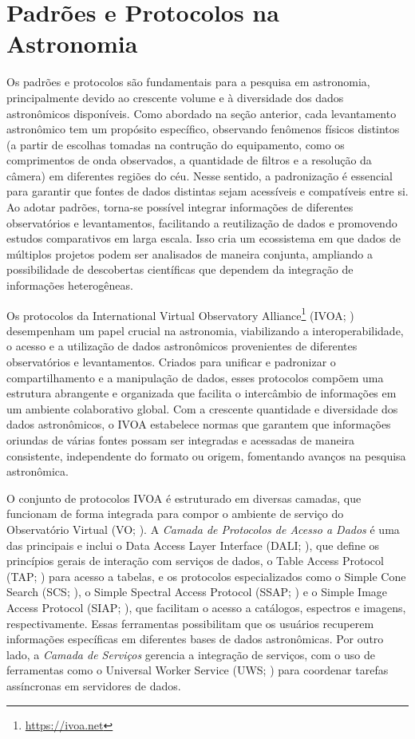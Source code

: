 \section{Padrões e Protocolos na Astronomia}
\label{sec:protocolos}

Os padrões e protocolos são fundamentais para a pesquisa em astronomia, principalmente devido ao crescente volume e à diversidade dos dados astronômicos disponíveis. Como abordado na seção anterior, cada levantamento astronômico tem um propósito específico, observando fenômenos físicos distintos (a partir de escolhas tomadas na contrução do equipamento, como os comprimentos de onda observados, a quantidade de filtros e a resolução da câmera) em diferentes regiões do céu. Nesse sentido, a padronização é essencial para garantir que  fontes de dados distintas sejam acessíveis e compatíveis entre si. Ao adotar padrões, torna-se possível integrar informações de diferentes observatórios e levantamentos, facilitando a reutilização de dados e promovendo estudos comparativos em larga escala. Isso cria um ecossistema em que dados de múltiplos projetos podem ser analisados de maneira conjunta, ampliando a possibilidade de descobertas científicas que dependem da integração de informações heterogêneas.

Os protocolos da International Virtual Observatory Alliance\footnote{\url{https://ivoa.net}} (IVOA; \citealp{ivoa}) desempenham um papel crucial na astronomia, viabilizando a interoperabilidade, o acesso e a utilização de dados astronômicos provenientes de diferentes observatórios e levantamentos. Criados para unificar e padronizar o compartilhamento e a manipulação de dados, esses protocolos compõem uma estrutura abrangente e organizada que facilita o intercâmbio de informações em um ambiente colaborativo global. Com a crescente quantidade e diversidade dos dados astronômicos, o IVOA estabelece normas que garantem que informações oriundas de várias fontes possam ser integradas e acessadas de maneira consistente, independente do formato ou origem, fomentando avanços na pesquisa astronômica.

O conjunto de protocolos IVOA é estruturado em diversas camadas, que funcionam de forma integrada para compor o ambiente de serviço do Observatório Virtual (VO; \citealp{voarch}). A \emph{Camada de Protocolos de Acesso a Dados} é uma das principais e inclui o Data Access Layer Interface (DALI; \citealp{dali}), que define os princípios gerais de interação com serviços de dados, o Table Access Protocol (TAP; \citealp{tap}) para acesso a tabelas, e os protocolos especializados como o Simple Cone Search (SCS; \citealp{scs}), o Simple Spectral Access Protocol (SSAP; \citealp{ssa}) e o Simple Image Access Protocol (SIAP; \citealp{siap}), que facilitam o acesso a catálogos, espectros e imagens, respectivamente. Essas ferramentas possibilitam que os usuários recuperem informações específicas em diferentes bases de dados astronômicas. Por outro lado, a \emph{Camada de Serviços} gerencia a integração de serviços, com o uso de ferramentas como o Universal Worker Service (UWS; \citealp{uws}) para coordenar tarefas assíncronas em servidores de dados.

